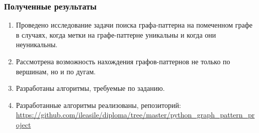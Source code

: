 \documentclass{beamer}
\begin{document}
\begin{frame}
\frametitle{Полученные результаты}
\begin{enumerate}
	\item Проведено исследование задачи поиска графа-паттерна на помеченном графе в случаях, когда метки на графе-паттерне уникальны и когда они неуникальны.
	\item Рассмотрена возможность нахождения графов-паттернов не только по вершинам, но и по дугам.
	\item Разработаны алгоритмы, требуемые по заданию.
	\item Разработанные алгоритмы реализованы, репозиторий: \url{https://github.com/ileasile/diploma/tree/master/python_graph_pattern_project}
\end{enumerate}
\end{frame}
 
\end{document}
